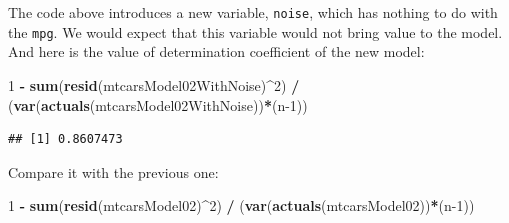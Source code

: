 \documentclass[
]{book}
\newenvironment{Shaded}{\begin{snugshade}}{\end{snugshade}}
\newcommand{\CommentTok}[1]{\textcolor[rgb]{0.56,0.35,0.01}{\textit{#1}}}
\newcommand{\DataTypeTok}[1]{\textcolor[rgb]{0.13,0.29,0.53}{#1}}
\newcommand{\DecValTok}[1]{\textcolor[rgb]{0.00,0.00,0.81}{#1}}
\newcommand{\KeywordTok}[1]{\textcolor[rgb]{0.13,0.29,0.53}{\textbf{#1}}}
\newcommand{\NormalTok}[1]{#1}
\newcommand{\OperatorTok}[1]{\textcolor[rgb]{0.81,0.36,0.00}{\textbf{#1}}}
\newcommand{\StringTok}[1]{\textcolor[rgb]{0.31,0.60,0.02}{#1}}
\theoremstyle{definition}
\theoremstyle{definition}
\theoremstyle{definition}
\theoremstyle{definition}
\theoremstyle{remark}
\begin{document}
\begin{Shaded}
\end{Shaded}

The code above introduces a new variable, \texttt{noise}, which has nothing to do with the \texttt{mpg}. We would expect that this variable would not bring value to the model. And here is the value of determination coefficient of the new model:

\begin{Shaded}
\begin{Highlighting}[]
\DecValTok{1} \OperatorTok{{-}}\StringTok{ }\KeywordTok{sum}\NormalTok{(}\KeywordTok{resid}\NormalTok{(mtcarsModel02WithNoise)}\OperatorTok{\^{}}\DecValTok{2}\NormalTok{) }\OperatorTok{/}
\StringTok{    }\NormalTok{(}\KeywordTok{var}\NormalTok{(}\KeywordTok{actuals}\NormalTok{(mtcarsModel02WithNoise))}\OperatorTok{*}\NormalTok{(n}\DecValTok{{-}1}\NormalTok{))}
\end{Highlighting}
\end{Shaded}

\begin{verbatim}
## [1] 0.8607473
\end{verbatim}

Compare it with the previous one:

\begin{Shaded}
\begin{Highlighting}[]
\DecValTok{1} \OperatorTok{{-}}\StringTok{ }\KeywordTok{sum}\NormalTok{(}\KeywordTok{resid}\NormalTok{(mtcarsModel02)}\OperatorTok{\^{}}\DecValTok{2}\NormalTok{) }\OperatorTok{/}
\StringTok{    }\NormalTok{(}\KeywordTok{var}\NormalTok{(}\KeywordTok{actuals}\NormalTok{(mtcarsModel02))}\OperatorTok{*}\NormalTok{(n}\DecValTok{{-}1}\NormalTok{))}
\end{Highlighting}
\end{Shaded}
\end{document}
